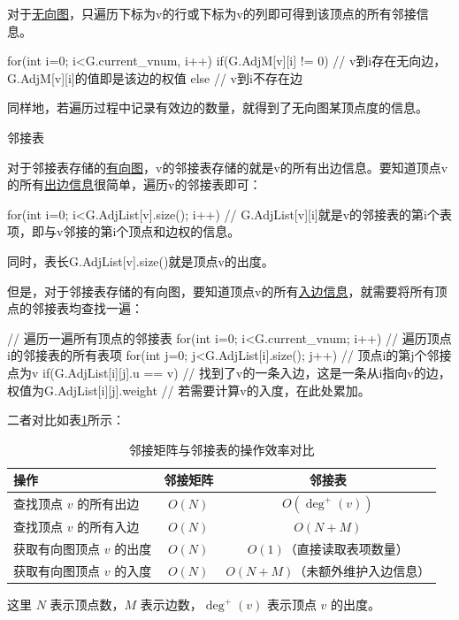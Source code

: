 对于\uline{无向图}，只遍历下标为v的行或下标为v的列即可得到该顶点的所有邻接信息。
\begin{cppcode}
    for(int i=0; i<G.current_vnum, i++) {
        if(G.AdjM[v][i] != 0) {
            // v到i存在无向边，G.AdjM[v][i]的值即是该边的权值
        } else {
            // v到i不存在边
        }
    }
\end{cppcode}
同样地，若遍历过程中记录有效边的数量，就得到了无向图某顶点度的信息。

\noindent {} 邻接表

对于邻接表存储的\uline{有向图}，v的邻接表存储的就是v的所有出边信息。要知道顶点v的所有\uline{出边信息}很简单，遍历v的邻接表即可：
\begin{cppcode}
    for(int i=0; i<G.AdjList[v].size(); i++) {
        // G.AdjList[v][i]就是v的邻接表的第i个表项，即与v邻接的第i个顶点和边权的信息。
    }
\end{cppcode}
同时，表长G.AdjList[v].size()就是顶点v的出度。

但是，对于邻接表存储的有向图，要知道顶点v的所有\uline{入边信息}，就需要将所有顶点的邻接表均查找一遍：
\begin{cppcode}
    // 遍历一遍所有顶点的邻接表
    for(int i=0; i<G.current_vnum; i++) {
        // 遍历顶点i的邻接表的所有表项
        for(int j=0; j<G.AdjList[i].size(); j++) {
            // 顶点i的第j个邻接点为v
            if(G.AdjList[i][j].u == v) {
                // 找到了v的一条入边，这是一条从i指向v的边，权值为G.AdjList[i][j].weight
                // 若需要计算v的入度，在此处累加。
            }
        }
    }
\end{cppcode}

二者对比如表\ref{table:邻接矩阵与邻接表的操作效率对比}所示：
\begin{table}[htbp]
    \centering
    \caption{邻接矩阵与邻接表的操作效率对比}
    \begin{tabular}{|l|c|c|}
        \hline
        操作 & 邻接矩阵 & 邻接表 \\
        \hline
        查找顶点 $v$ 的所有出边
        & $O(N)$
        & $O(\deg^+(v))$ \\
        \hline
        查找顶点 $v$ 的所有入边
        & $O(N)$
        & $O(N+M)$ \\
        \hline
        获取有向图顶点 $v$ 的出度
        & $O(N)$
        & $O(1)$（直接读取表项数量） \\
        \hline
        获取有向图顶点 $v$ 的入度
        & $O(N)$
        & $O(N+M)$（未额外维护入边信息） \\
        \hline
    \end{tabular}
    \label{table:邻接矩阵与邻接表的操作效率对比}
\end{table}
这里 \(N\) 表示顶点数，\(M\) 表示边数，\(\deg^+(v)\) 表示顶点 \(v\) 的出度。


